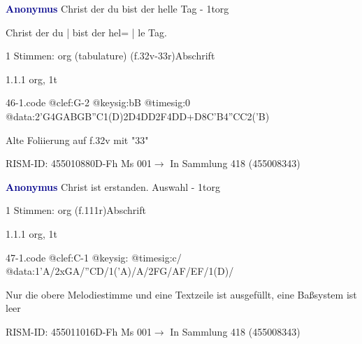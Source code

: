 \documentclass[twocolumn]{book}
\begin{document}
\par \vspace{7pt} \textcolor{darkblue}{\textbf{Anonymus  }}\hfillplus{\textbf{[46]}}\newline Christ der du bist der helle Tag - 1t\newline org
\par \begin{itshape}[f.32v, at left:] Christ der du | bist der hel= | le Tag.\end{itshape} 
\par \textcolor{darkblue}{}  1 Stimmen: org (tabulature)  (f.32v-33r)\newline Abschrift
\par 1.1.1  org, 1t  
\begin{filecontents*}{46-1.code}
@clef:G-2
@keysig:bB
@timesig:0
@data:2'G4GABGB''C1(D)2D4DD2F4DD+D{8C'B}4''CC2('B)
\end{filecontents*}
\newline
%
\par Alte Foliierung auf f.32v mit "33"
\par RISM-ID: 455010880\newline D-Fh  Ms 001\newline $\rightarrow$ In Sammlung 418 (455008343)
      
\par \vspace{7pt} \textcolor{darkblue}{\textbf{Anonymus  }}\hfillplus{\textbf{[47]}}\newline Christ ist erstanden. Auswahl - 1t\newline org
\par \begin{itshape}\end{itshape} 
\par \textcolor{darkblue}{}  1 Stimmen: org  (f.111r)\newline Abschrift
\par 1.1.1  org, 1t\newline \begin{footnotesize}  \end{footnotesize}  
\begin{filecontents*}{47-1.code}
@clef:C-1
@keysig:
@timesig:c/
@data:1'A/2xGA/''CD/1('A)/A/2FG/AF/EF/1(D)/
\end{filecontents*}
\newline
%
\par Nur die obere Melodiestimme und eine Textzeile ist ausgefüllt, eine Baßsystem ist leer
\par RISM-ID: 455011016\newline D-Fh  Ms 001\newline $\rightarrow$ In Sammlung 418 (455008343)
      
\end{document}
